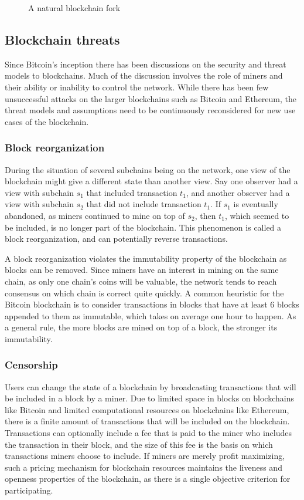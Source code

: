 \begin{figure}[htbp]
  \centering
  
  \caption{A natural blockchain fork}
\end{figure}


\subsection{Blockchain threats}

Since Bitcoin's inception there has been discussions on the security and threat models to blockchains. Much of the discussion involves the role of miners and their ability or inability to control the network. While there has been few unsuccessful attacks on the larger blockchains such as Bitcoin and Ethereum, the threat models and assumptions need to be continuously reconsidered for new use cases of the blockchain.

\subsubsection{Block reorganization}
During the situation of several subchains being on the network, one view of the blockchain might give a different state than another view. Say one observer had a view with subchain $s_1$ that included transaction $t_1$, and another observer had a view with subchain $s_2$ that did not include transaction $t_1$. If $s_1$ is eventually abandoned, as miners continued to mine on top of $s_2$, then $t_1$, which seemed to be included, is no longer part of the blockchain. This phenomenon is called a block reorganization, and can potentially reverse transactions.

A block reorganization violates the immutability property of the blockchain as blocks can be removed. Since miners have an interest in mining on the same chain, as only one chain's coins will be valuable, the network tends to reach consensus on which chain is correct quite quickly. A common heuristic for the Bitcoin blockchain is to consider transactions in blocks that have at least 6 blocks appended to them as immutable, which takes on average one hour to happen. As a general rule, the more blocks are mined on top of a block, the stronger its immutability. 


\subsubsection{Censorship}
Users can change the state of a blockchain by broadcasting transactions that will be included in a block by a miner. Due to limited space in blocks on blockchains like Bitcoin and limited computational resources on blockchains like Ethereum, there is a finite amount of transactions that will be included on the blockchain. Transactions can optionally include a fee that is paid to the miner who includes the transaction in their block, and the size of this fee is the basis on which transactions miners choose to include. If miners are merely profit maximizing, such a pricing mechanism for blockchain resources maintains the liveness and openness properties of the blockchain, as there is a single objective criterion for participating.


